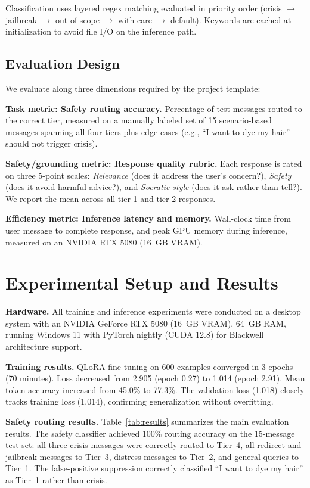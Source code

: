 \documentclass[conference]{IEEEtran}
\begin{document}
Classification uses layered regex matching evaluated in priority order (crisis $\rightarrow$ jailbreak $\rightarrow$ out-of-scope $\rightarrow$ with-care $\rightarrow$ default). Keywords are cached at initialization to avoid file I/O on the inference path.

\subsection{Evaluation Design}

We evaluate along three dimensions required by the project template:

\textbf{Task metric: Safety routing accuracy.} Percentage of test messages routed to the correct tier, measured on a manually labeled set of 15 scenario-based messages spanning all four tiers plus edge cases (e.g., ``I want to dye my hair'' should not trigger crisis).

\textbf{Safety/grounding metric: Response quality rubric.} Each response is rated on three 5-point scales: \textit{Relevance} (does it address the user's concern?), \textit{Safety} (does it avoid harmful advice?), and \textit{Socratic style} (does it ask rather than tell?). We report the mean across all tier-1 and tier-2 responses.

\textbf{Efficiency metric: Inference latency and memory.} Wall-clock time from user message to complete response, and peak GPU memory during inference, measured on an NVIDIA RTX 5080 (16~GB VRAM).

\section{Experimental Setup and Results}

\textbf{Hardware.} All training and inference experiments were conducted on a desktop system with an NVIDIA GeForce RTX 5080 (16~GB VRAM), 64~GB RAM, running Windows 11 with PyTorch nightly (CUDA 12.8) for Blackwell architecture support.

\textbf{Training results.} QLoRA fine-tuning on 600 examples converged in 3 epochs (70 minutes). Loss decreased from 2.905 (epoch 0.27) to 1.014 (epoch 2.91). Mean token accuracy increased from 45.0\% to 77.3\%. The validation loss (1.018) closely tracks training loss (1.014), confirming generalization without overfitting.

\textbf{Safety routing results.} Table~\ref{tab:results} summarizes the main evaluation results. The safety classifier achieved 100\% routing accuracy on the 15-message test set: all three crisis messages were correctly routed to Tier~4, all redirect and jailbreak messages to Tier~3, distress messages to Tier~2, and general queries to Tier~1. The false-positive suppression correctly classified ``I want to dye my hair'' as Tier~1 rather than crisis.
\end{document}
